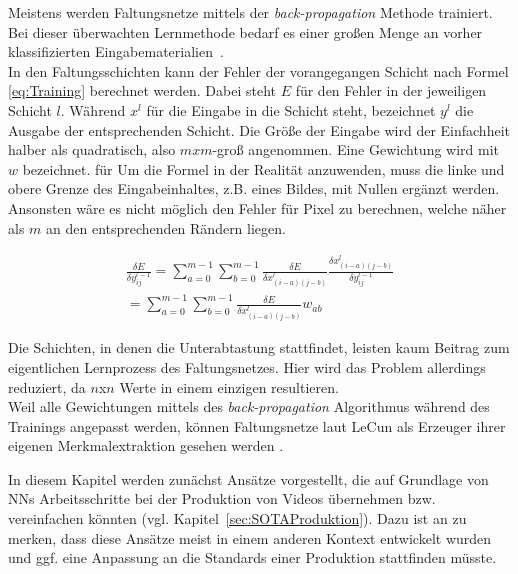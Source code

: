 \documentclass[times, 12pt,twocolumn]{article}
\begin{document}
 \label{sec:Training}
Meistens werden Faltungsnetze mittels der \textit{back-propagation} Methode trainiert. Bei dieser überwachten Lernmethode bedarf es einer großen Menge an vorher klassifizierten Eingabematerialien~\cite{5537907}. \\
In den Faltungsschichten kann der Fehler der vorangegangen Schicht nach Formel \ref{eq:Training} berechnet werden. Dabei steht $E$ für den Fehler in der jeweiligen Schicht $l$. Während $x^l$ für die Eingabe in die Schicht steht, bezeichnet $y^l$ die Ausgabe der entsprechenden Schicht. Die Größe der Eingabe wird der Einfachheit halber als quadratisch, also $mxm$-groß angenommen. Eine Gewichtung wird mit $w$ bezeichnet. für Um die Formel in der Realität anzuwenden, muss die linke und obere Grenze des Eingabeinhaltes, z.B. eines Bildes, mit Nullen ergänzt werden. Ansonsten wäre es nicht möglich den Fehler für Pixel zu berechnen, welche näher als $m$ an den entsprechenden Rändern liegen. 

\footnotesize
\begin{equation}
\begin{aligned}
\frac{\delta E}{\delta y_{ij}^{l-1}} = \sum_{a=0}^{m-1} \sum_{b=0}^{m-1} \frac{\delta E}{\delta x_{(i-a)(j-b)}^{l}} \frac{\delta x_{(i-a)(j-b)}^{l}}{\delta y_{ij}^{l-1}}  \\
= \sum \limits_{a=0}^{m-1} \sum \limits_{b=0}^{m-1} \frac{\delta E}{\delta x_{(i-a)(j-b)}^{l}} w_{ab}
\end{aligned}
	\label{eq:Training}
\end{equation}
\small

Die Schichten, in denen die Unterabtastung stattfindet, leisten kaum Beitrag zum eigentlichen Lernprozess des Faltungsnetzes. Hier wird das Problem allerdings reduziert, da $n$x$n$ Werte in einem einzigen resultieren. \\
Weil alle Gewichtungen mittels des \textit{back-propagation} Algorithmus während des Trainings angepasst werden, können Faltungsnetze laut LeCun als Erzeuger ihrer eigenen Merkmalextraktion gesehen werden \cite{LeCun:1998:CNI:303568.303704}.








 \label{sec:Vorverarbeitung}
 \label{sec:SOTAVorverarbeitung}

 \label{sec:Produktion}
In diesem Kapitel werden zunächst Ansätze vorgestellt, die auf Grundlage von NNs Arbeitsschritte bei der Produktion von Videos übernehmen bzw. vereinfachen könnten (vgl. Kapitel~\ref{sec:SOTAProduktion}). Dazu ist an zu merken, dass diese Ansätze meist in einem anderen Kontext entwickelt wurden und ggf. eine Anpassung an die Standards einer Produktion stattfinden müsste. \\
\end{document}
